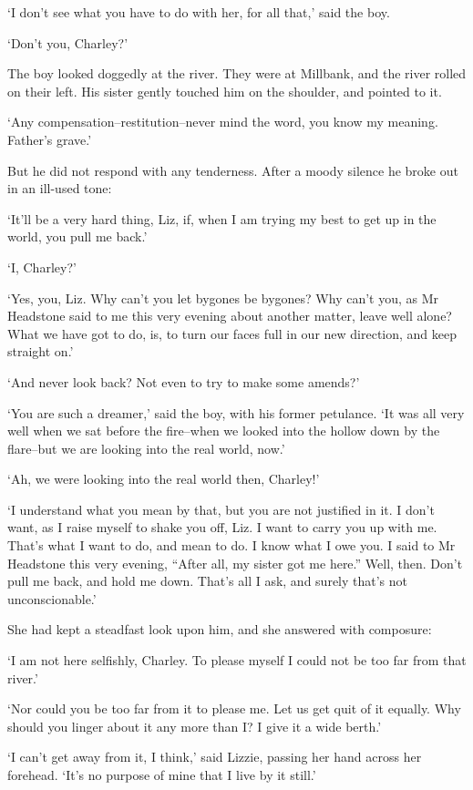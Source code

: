 ‘I don’t see what you have to do with her, for all that,’ said the boy.

‘Don’t you, Charley?’

The boy looked doggedly at the river. They were at Millbank, and
the river rolled on their left. His sister gently touched him on the
shoulder, and pointed to it.

‘Any compensation--restitution--never mind the word, you know my
meaning. Father’s grave.’

But he did not respond with any tenderness. After a moody silence he
broke out in an ill-used tone:

‘It’ll be a very hard thing, Liz, if, when I am trying my best to get up
in the world, you pull me back.’

‘I, Charley?’

‘Yes, you, Liz. Why can’t you let bygones be bygones? Why can’t you, as
Mr Headstone said to me this very evening about another matter, leave
well alone? What we have got to do, is, to turn our faces full in our
new direction, and keep straight on.’

‘And never look back? Not even to try to make some amends?’

‘You are such a dreamer,’ said the boy, with his former petulance. ‘It
was all very well when we sat before the fire--when we looked into the
hollow down by the flare--but we are looking into the real world, now.’

‘Ah, we were looking into the real world then, Charley!’

‘I understand what you mean by that, but you are not justified in it. I
don’t want, as I raise myself to shake you off, Liz. I want to carry you
up with me. That’s what I want to do, and mean to do. I know what I owe
you. I said to Mr Headstone this very evening, “After all, my sister got
me here.” Well, then. Don’t pull me back, and hold me down. That’s all I
ask, and surely that’s not unconscionable.’

She had kept a steadfast look upon him, and she answered with composure:

‘I am not here selfishly, Charley. To please myself I could not be too
far from that river.’

‘Nor could you be too far from it to please me. Let us get quit of it
equally. Why should you linger about it any more than I? I give it a
wide berth.’

‘I can’t get away from it, I think,’ said Lizzie, passing her hand
across her forehead. ‘It’s no purpose of mine that I live by it still.’

